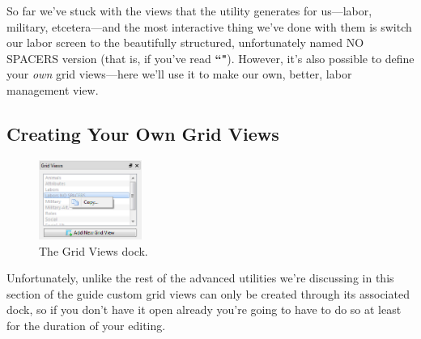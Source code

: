 \documentclass[]{article}
\begin{document}
So far we've stuck with the views that the utility generates for us---labor, military, etcetera---and
the most interactive thing we've done with them is switch our labor screen to the beautifully
structured, unfortunately named NO SPACERS version (that is, if you've read
\textbf{``"}). However, it's also possible to define your
\emph{own} grid views---here we'll use it to make our own, better, labor management view.

\subsection{Creating Your Own Grid Views}
\label{sec:Creating Your Own Grid Views}
\begin{figure}
\vspace{-20pt}
  \begin{center}
    \includegraphics[width=0.3\textwidth]{Sec3Fig13}
  \end{center}
\vspace{-15pt}
\caption{The Grid Views dock.}
\vspace{-15pt}
\end{figure}
Unfortunately, unlike the rest of the advanced utilities we're discussing in this section of the guide
custom grid views can only be created through its associated dock, so if you don't have it open already
you're going to have to do so at least for the duration of your editing.
\end{document}
